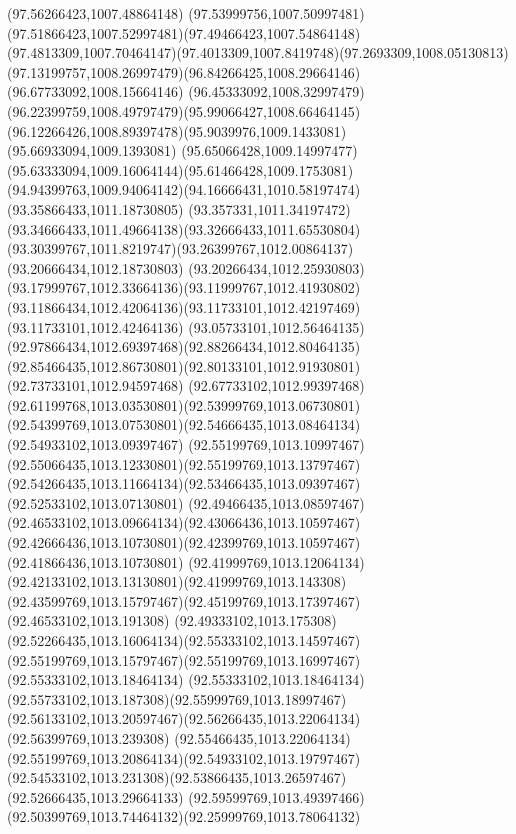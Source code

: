 {    \moveto(97.56266423,1007.48864148)
    \curveto(97.53999756,1007.50997481)(97.51866423,1007.52997481)(97.49466423,1007.54864148)
    \curveto(97.4813309,1007.70464147)(97.4013309,1007.8419748)(97.2693309,1008.05130813)
    \curveto(97.13199757,1008.26997479)(96.84266425,1008.29664146)(96.67733092,1008.15664146)
    \curveto(96.45333092,1008.32997479)(96.22399759,1008.49797479)(95.99066427,1008.66464145)
    \curveto(96.12266426,1008.89397478)(95.9039976,1009.1433081)(95.66933094,1009.1393081)
    \curveto(95.65066428,1009.14997477)(95.63333094,1009.16064144)(95.61466428,1009.1753081)
    \curveto(94.94399763,1009.94064142)(94.16666431,1010.58197474)(93.35866433,1011.18730805)
    \curveto(93.357331,1011.34197472)(93.34666433,1011.49664138)(93.32666433,1011.65530804)
    \curveto(93.30399767,1011.8219747)(93.26399767,1012.00864137)(93.20666434,1012.18730803)
    \curveto(93.20266434,1012.25930803)(93.17999767,1012.33664136)(93.11999767,1012.41930802)
    \curveto(93.11866434,1012.42064136)(93.11733101,1012.42197469)(93.11733101,1012.42464136)
    \curveto(93.05733101,1012.56464135)(92.97866434,1012.69397468)(92.88266434,1012.80464135)
    \curveto(92.85466435,1012.86730801)(92.80133101,1012.91930801)(92.73733101,1012.94597468)
    \curveto(92.67733102,1012.99397468)(92.61199768,1013.03530801)(92.53999769,1013.06730801)
    \curveto(92.54399769,1013.07530801)(92.54666435,1013.08464134)(92.54933102,1013.09397467)
    \curveto(92.55199769,1013.10997467)(92.55066435,1013.12330801)(92.55199769,1013.13797467)
    \curveto(92.54266435,1013.11664134)(92.53466435,1013.09397467)(92.52533102,1013.07130801)
    \curveto(92.49466435,1013.08597467)(92.46533102,1013.09664134)(92.43066436,1013.10597467)
    \curveto(92.42666436,1013.10730801)(92.42399769,1013.10597467)(92.41866436,1013.10730801)
    \curveto(92.41999769,1013.12064134)(92.42133102,1013.13130801)(92.41999769,1013.143308)
    \curveto(92.43599769,1013.15797467)(92.45199769,1013.17397467)(92.46533102,1013.191308)
    \curveto(92.49333102,1013.175308)(92.52266435,1013.16064134)(92.55333102,1013.14597467)
    \curveto(92.55199769,1013.15797467)(92.55199769,1013.16997467)(92.55333102,1013.18464134)
    \curveto(92.55333102,1013.18464134)(92.55733102,1013.187308)(92.55999769,1013.18997467)
    \curveto(92.56133102,1013.20597467)(92.56266435,1013.22064134)(92.56399769,1013.239308)
    \curveto(92.55466435,1013.22064134)(92.55199769,1013.20864134)(92.54933102,1013.19797467)
    \curveto(92.54533102,1013.231308)(92.53866435,1013.26597467)(92.52666435,1013.29664133)
    \curveto(92.59599769,1013.49397466)(92.50399769,1013.74464132)(92.25999769,1013.78064132)
}
